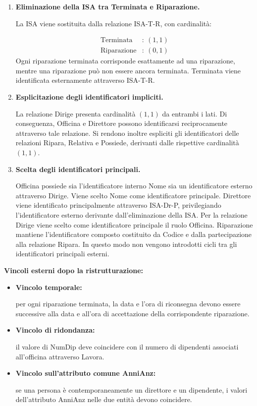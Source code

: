 \begin{enumerate}
    \item \textbf{Eliminazione della ISA
    tra Terminata e Riparazione.}

    La ISA viene sostituita dalla relazione
    ISA-T-R, con cardinalità:

    \[
    \begin{aligned}
    \text{Terminata}&:\ (1,1)\\
    \text{Riparazione}&:\ (0,1)
    \end{aligned}
    \]
    Ogni riparazione terminata corrisponde
    esattamente ad una riparazione, mentre
    una riparazione può non essere ancora
    terminata.
    Terminata viene identificata esternamente
    attraverso ISA-T-R.

    \item \textbf{Esplicitazione degli
    identificatori impliciti.}

    La relazione Dirige presenta cardinalità
    $(1,1)$ da entrambi i lati.
    Di conseguenza, Officina e Direttore
    possono identificarsi reciprocamente
    attraverso tale relazione.
    Si rendono inoltre espliciti gli
    identificatori delle relazioni Ripara,
    Relativa e Possiede, derivanti dalle
    rispettive cardinalità $(1,1)$.

    \item \textbf{Scelta degli identificatori
    principali.}

    Officina possiede sia l'identificatore
    interno Nome sia un identificatore
    esterno attraverso Dirige.
    Viene scelto Nome come identificatore
    principale.
    Direttore viene identificato principalmente
    attraverso ISA-Dr-P, privilegiando
    l'identificatore esterno derivante
    dall'eliminazione della ISA.
    Per la relazione Dirige viene scelto
    come identificatore principale il ruolo
    Officina.
    Riparazione mantiene l'identificatore
    composto costituito da Codice e dalla
    partecipazione alla relazione Ripara.
    In questo modo non vengono introdotti
    cicli tra gli identificatori principali
    esterni.
\end{enumerate}

\noindent
\textbf{Vincoli esterni dopo la ristrutturazione:}

\begin{itemize}
    \item \textbf{Vincolo temporale:}

    per ogni riparazione terminata, la data
    e l'ora di riconsegna devono essere
    successive alla data e all'ora di
    accettazione della corrispondente
    riparazione.

    \item \textbf{Vincolo di ridondanza:}

    il valore di NumDip deve coincidere
    con il numero di dipendenti associati
    all'officina attraverso Lavora.

    \item \textbf{Vincolo sull'attributo
    comune AnniAnz:}

    se una persona è contemporaneamente
    un direttore e un dipendente, i valori
    dell'attributo AnniAnz nelle due entità
    devono coincidere.
\end{itemize}

